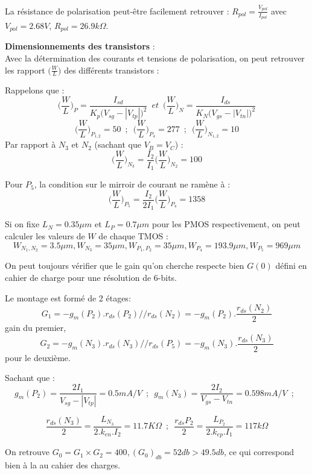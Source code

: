 \documentclass[11pt]{article}
\begin{document}
La r\'esistance de polarisation peut-\^etre facilement retrouver : $R_{pol} = \frac{V_{pol}}{I_{pol}}$
avec $V_{pol} = 2.68 V$, $ R_{pol} = 26.9 k \Omega$.

\textbf{Dimensionnements des transistors} :\\
Avec la d\'etermination des courants et tensions de polarisation, on peut retrouver les
rapport $\Big( \frac{W}{L} \Big)$ des diff\'erents transistors :

Rappelons que :
\[
\bigg( \frac{W}{L} \bigg)_{P} = \frac{I_{sd}}{K_p \big( V_{sg} - |V_{tp}| \big)^{2} }
\phantom{3} et \phantom{3}
\bigg( \frac{W}{L} \bigg)_{N} = \frac{I_{ds}}{K_N \big( V_{gs} - |V_{tn}| \big)^{2} } 
\]
\[
\bigg( \frac{W}{L} \bigg)_{P_{1,2}} = 50
\phantom{3}
;
\phantom{3}
\bigg( \frac{W}{L} \bigg)_{P_{4}} = 277
\phantom{3}
;
\phantom{3}
\bigg( \frac{W}{L} \bigg)_{N_{1,2}} = 10
\]
Par rapport \`a $N_3$ et $N_2$ (sachant que $V_B = V_C$) :
\[
\bigg( \frac{W}{L} \bigg)_{N_{3}} = \frac{I_2}{I_1} \bigg( \frac{W}{L} \bigg)_{N_{2}}  = 100  
\]

Pour $P_5$, la condition sur le mirroir de courant ne ram\`ene \`a :
\[
\bigg( \frac{W}{L} \bigg)_{P_{5}} = \frac{I_2}{2 I_1} \bigg( \frac{W}{L} \bigg)_{P_{4}} = 1358
\]

Si on fixe $L_N = 0.35 \mu m$ et $L_P = 0.7 \mu m$ pour les PMOS respectivement, on peut calculer les
valeurs de $W$ de chaque TMOS :
\[
W_{N_1,N_2} = 3.5 \mu m, W_{N_3} = 35 \mu m, W_{P_1, P_2} = 35 \mu m, W_{P_4} = 193.9 \mu m, W_{P_5} = 969 \mu m
\]

On peut toujours v\'erifier que le gain qu'on cherche respecte bien $G(0)$ d\'efini en cahier de charge
pour une r\'esolution de 6-bits.

Le montage est form\'e de 2 \'etages:
\[
G_1 = - g_m (P_2).r_{ds}(P_2)//r_{ds}(N_2) = -g_m(P_2).\frac{r_{ds}(N_2)}{2}
\]
gain du premier,
\[
G_2 = - g_m (N_3).r_{ds}(N_3)//r_{ds}(P_5) = -g_m(N_3).\frac{r_{ds}(N_3)}{2}
\]
pour le deuxi\`eme.

Sachant que :
\[
g_m(P_2) = \frac{2I_1}{V_{sg} - | V_{tp} | } = 0.5  mA/V
\phantom{3}
;
\phantom{3}
g_m(N_3) = \frac{2 I_2}{V_{gs} - V_{tn}} = 0.598 mA/V
\phantom{3}
;
\phantom{3}
\]

\[
\frac{r_{ds}(N_3)}{2} = \frac{L_{N_{3}}}{2.k_{en}.I_{2}} = 11.7 K\Omega
\phantom{3}
;
\phantom{3}
\frac{r_{ds}{P_2}}{2} = \frac{L_{P_{2}}}{2.k_{ep}.I_{1}} = 117 k\Omega
\]

On retrouve $G_0 = G_1 \times G_2 = 400, (G_0)_{db} = 52 db > 49.5 db$, ce qui correspond bien \`a la
au cahier des charges.
\end{document}
